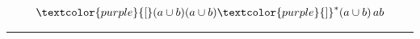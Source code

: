 \par
\begin{comment}
\phantom{\text{Κανονική έκφραση}}
\begin{equation*}
	{\boldmath \fcolorbox{black}{lime}{$\textcolor{purple}{[}(a\cup b)(a\cup b)\textcolor{purple}{]}^*(a\cup
				b)\,ab$}
	\;\;\;\;\;\;\;\;\;\;\text{Κανονική έκφραση}}
\end{equation*}
\end{comment}

{}
\begin{tcolorbox}[colback=yellow!15!white, colframe=blue!50!white,
	fonttitle=\bfseries\Large, title = Κανονική έκφραση]
	\reducevspace\reducevspace\reducevspace\reducevspace\reducevspace\reducevspace\reducevspace
	\reducevspace\reducevspace\reducevspace\reducevspace\reducevspace\reducevspace\reducevspace
	\begin{align*}
		\begin{gathered}
			\textcolor{purple}{[}(a\cup b)(a\cup
			b)\textcolor{purple}{]}^*(a\cup
					b)\,ab
		\end{gathered}
	\end{align*}
\end{tcolorbox}
\begin{center}
	\noindent\rule{\linewidth}{0.5pt}
\end{center}
\clearpage
